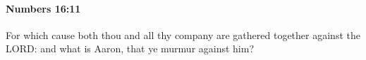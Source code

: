 
		\paragraph{Numbers 16:11} %
			\label{NUMBERS-16-11}

			For which cause both thou and all thy company are gathered together against the LORD: and what is Aaron, that ye murmur against him?


